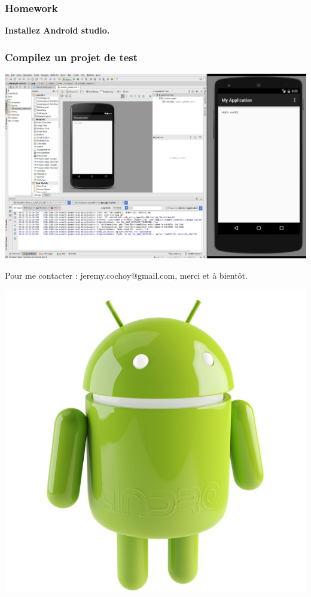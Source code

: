 \documentclass{beamer}
\begin{document}
\begin{frame}
\frametitle{Homework}

\begin{center}
\textbf{Installez Android studio.}
\end{center}

\end{frame}

\begin{frame}
\frametitle{Compilez un projet de test}
\begin{center}
\includegraphics[scale=0.18]{android_test.png}
\end{center}
\end{frame}

\begin{frame}
\begin{center}
Pour me contacter : jeremy.cochoy@gmail.com, merci et à bientôt.

\includegraphics[scale=0.18]{android.jpg}
\end{center}
\end{frame}
\end{document}
